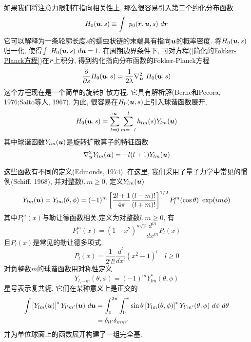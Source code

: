 如果我们将注意力限制在指向相关性上, 那么很容易引入第二个约化分布函数\\
\begin{equation}
	H_0(\bu,s)\equiv\int \ p_0(\br,\bu,s)\ d\br\label{第二个约化分布函数}
\end{equation}
它可以解释为一条轮廓长度$s$的蠕虫状链的末端具有指向$\bm{u}$的概率密度. 将$H_0(\bm{u},s)$归一化, 使得$\int \  H_0(\bm{u},s)\ d\bm{u}=1$. 在周期边界条件下, 可对方程(\ref{简化的Fokker-Planck方程})在$\bm{r}$上积分, 得到约化指向分布函数的Fokker-Planck方程\\
\begin{equation}
	\frac{\partial}{\partial s}H_0(\bu,s)=\frac{1}{2\lambda}\nabla_{\bu}^2\ H_0(\bu,s)\label{约化指向分布函数的Fokker-Planck方程}
\end{equation}
这个方程现在是一个简单的旋转扩散方程, 它具有解析解(Berne和Pecora, 1976;Saito等人, 1967). 为此, 很容易在$H_0(\bm{u},s)$上引入球谐函数展开, \\
\begin{equation}
	H_0(\bm{u},s)=\sum_{l=0}^{\infty}\sum_{m=-l}^{l}h_{lm}(s)Y_{lm}(\bm{u})\label{球谐函数展开}
\end{equation}
其中球谐函数$Y_{lm}(\bm{u})$是旋转扩散算子的特征函数
\begin{equation}
\nabla_{\bm{u}}^2Y_{lm}(\bm{u}) =-l(l+1)Y_{lm}(\bm{u})
\end{equation}

这些函数有不同的定义(Edmonds, 1974). 在这里, 我们采用了量子力学中常见的惯例(Schiff, 1968), 并对整数$l,m\geq 0$, 定义$Y_{lm}(\bm{u})$\\
\begin{equation}
Y_{lm}(\bm{u}) = Y_{lm}(\theta,\phi)=(-1)^m\left[\frac{2l+1}{4\pi}\frac{(l-m)!}{(l+m)!}\right]^{1/2}P_l^m(\cos \theta )\ \exp(im\phi)
\end{equation}
其中$P_l^m(x)$与勒让德函数相关,定义为对整数$l,m\geq 0$, 有\\
\begin{equation}
P_l^m(x)=(1-x^2)^{m/2}\frac{d^m}{dx^m}P_l(x)
\end{equation}
且$P_l(x)$是常见的勒让德多项式, \\
\begin{equation}
P_l(x)=\frac{1}{2^ll!}\frac{d^l}{dx^l}(x^2-1)^l\quad l\geq 0
\end{equation}
对负整数$m$的球谐函数用对称性定义\\
\begin{equation}
Y_{l,-m}(\theta,\phi) =(-1)^m Y_{lm}^*(\theta,\phi)
\end{equation}
星号表示复共轭. 它们在某种意义上是正交的\\
\begin{equation}
\begin{aligned}
\int  \left[Y_{lm}(\bu)\right]^*Y_{l'm'}(\bu)\ d\bu&=\int_{0}^{2\pi}\int_{0}^{\pi}\sin\theta\left[Y_{lm}(\theta,\phi)\right]^*Y_{l'm'}(\theta,\phi) \ d\phi\   d\theta\\&=\delta_{ll'}\delta_{mm'}
\end{aligned}
\end{equation}
并为单位球面上的函数展开构建了一组完全基. \\


